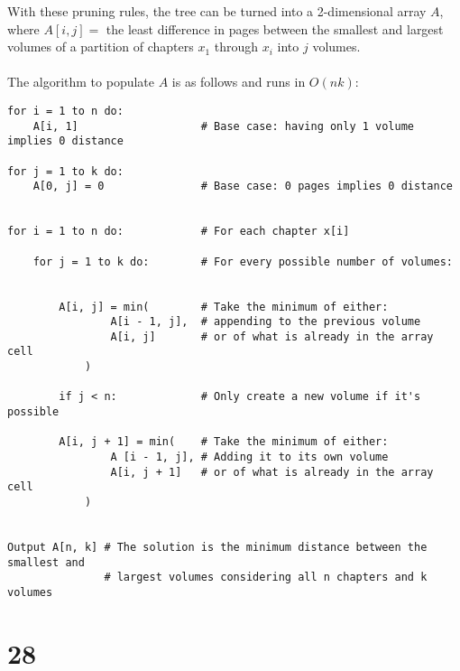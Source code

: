 \documentclass[letterpaper,notitlepage,twoside]{article}
\begin{document}
With these pruning rules, the tree can be turned into a 2-dimensional array $A$,
where $A[i, j] =$ the least difference in pages between the smallest and largest
 volumes of a partition of chapters $x_1$ through $x_i$ into $j$ volumes.
\\\\
The algorithm to populate $A$ is as follows and runs in $O(nk)$:
\begin{verbatim}
for i = 1 to n do:
    A[i, 1]                   # Base case: having only 1 volume implies 0 distance

for j = 1 to k do:
    A[0, j] = 0               # Base case: 0 pages implies 0 distance


for i = 1 to n do:            # For each chapter x[i]

    for j = 1 to k do:        # For every possible number of volumes:


        A[i, j] = min(        # Take the minimum of either:
                A[i - 1, j],  # appending to the previous volume
                A[i, j]       # or of what is already in the array cell
            )

        if j < n:             # Only create a new volume if it's possible

        A[i, j + 1] = min(    # Take the minimum of either:
                A [i - 1, j], # Adding it to its own volume
                A[i, j + 1]   # or of what is already in the array cell
            )


Output A[n, k] # The solution is the minimum distance between the smallest and
               # largest volumes considering all n chapters and k volumes
\end{verbatim}

\section*{28}
\end{document}
